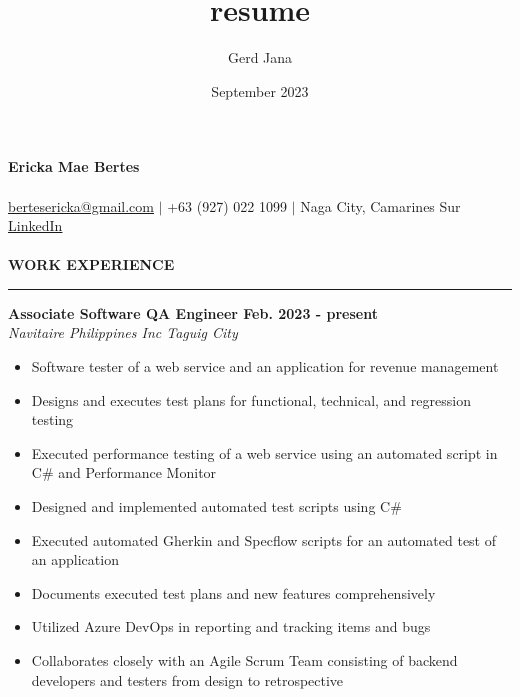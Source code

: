 \documentclass{amsbook}
\title{resume}
\author{Gerd Jana}
\date{September 2023}
\begin{document}
\hspace{-1cm}\textbf{{\larger[8] Ericka Mae Bertes}}
\\\\
{\larger[2]\href{mailto:bertesericka@gmail.com}{bertesericka@gmail.com} } $|$ +63 (927) 022 1099 $|$ Naga City, Camarines Sur\\
\underline{\href{https://www.linkedin.com/in/ericka-mae-bertes-3590a2168/}{LinkedIn}} 
\\
\\
\textbf{WORK EXPERIENCE}
\\
\rule{\textwidth}{1pt} 
\textbf{Associate Software QA Engineer \hfill Feb. 2023 \@- present}
\\
\textit{Navitaire Philippines Inc \hfill Taguig City}
\begin{itemize}
    \item Software tester of a web service and an application for revenue management
    \item Designs and executes test plans for functional, technical, and regression testing
    \item Executed performance testing of a web service using an automated script in C\# and Performance Monitor
    \item Designed and implemented automated test scripts using C\#
    \item Executed automated Gherkin and Specflow scripts for an automated test of an application
    \item Documents executed test plans and new features comprehensively
    \item Utilized Azure DevOps in reporting and tracking items and bugs
    \item Collaborates closely with an Agile Scrum Team consisting of backend developers and testers from design to retrospective
    
\end{itemize}
\end{document}
